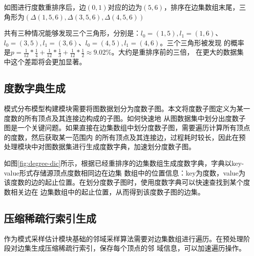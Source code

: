 \documentclass[master]{thesis-uestc}
\begin{document}
    如图进行度数重排序后，边$(0,1)$对应的边为$(5,6)$，排序在边集数组末尾，三角形为$(\Delta(1,5,6),\Delta(3,5,6),\Delta(4,5,6))$

共有三种情况能够发现三个三角形，分别是：$l_0=(1,5),l_1=(1,6)$、$l_0=(3,5),l_1=(3,6)$、$l_0=(4,5),l_1=(4,6)$。三个三角形被发现
的概率是$p=\frac{1}{12}*\frac{1}{4}+\frac{1}{12}*\frac{1}{3}+\frac{1}{12}*\frac{1}{2}\approx9.02\%$。大约是重排序前的三倍，
在更大的数据集中这个差距将会更加显著。

\subsection{度数字典生成}
\label{subsec:deg-dic}
    模式分布模型构建模块需要将图数据划分为度数子图。本文将度数子图定义为某一度数的所有顶点及其连接边构成的子图。如何快速地
从图数据集中划分出度数子图是一个关键问题。如果直接在边集数组中划分度数子图，需要遍历计算所有顶点的度数，然后获取某一范围内
的所有顶点及其连接边，过程耗时较长，因此在预处理模块中对图数据集进行生成度数字典，加速划分度数子图。

    如图\ref{fig:degree-dic}所示，根据已经重排序的边集数组生成度数字典，字典以key-value形式存储源顶点度数相同边在边集
数组中的位置信息：key为度数，value为该度数的边的起止位置。在划分度数子图时，使用度数字典可以快速查找到某个度数相关边在
边集数组中的起止位置，从而得到该度数子图的边集。

\subsection{压缩稀疏行索引生成}
\label{subsec:csr}
    作为模式采样估计模块基础的邻域采样算法需要对边集数组进行遍历。在预处理阶段对边集生成压缩稀疏行索引，保存每个顶点的邻
域信息，可以加速遍历操作。
\end{document}
